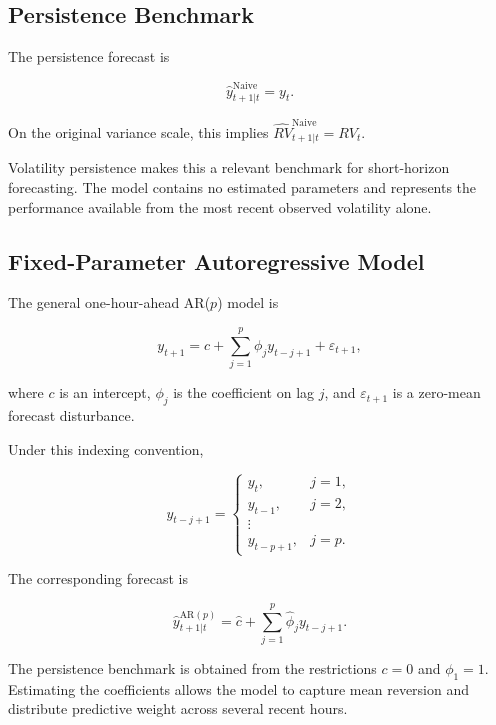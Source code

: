 \subsection{Persistence Benchmark}

The persistence forecast is

\begin{equation}
\widehat{y}_{t+1|t}^{\mathrm{Naive}}
=
y_t.
\label{eq:naive-model}
\end{equation}

On the original variance scale, this implies
\(\widehat{RV}_{t+1|t}^{\mathrm{Naive}}=RV_t\).

Volatility persistence makes this a relevant benchmark for
short-horizon forecasting. The model contains no estimated
parameters and represents the performance available from the
most recent observed volatility alone.

\subsection{Fixed-Parameter Autoregressive Model}

The general one-hour-ahead AR(\(p\)) model is

\begin{equation}
y_{t+1}
=
c
+
\sum_{j=1}^{p}
\phi_j y_{t-j+1}
+
\varepsilon_{t+1},
\label{eq:ar-model}
\end{equation}

where \(c\) is an intercept, \(\phi_j\) is the coefficient on
lag \(j\), and \(\varepsilon_{t+1}\) is a zero-mean forecast
disturbance.

Under this indexing convention,

\[
y_{t-j+1}
=
\begin{cases}
y_t, & j=1,\\
y_{t-1}, & j=2,\\
\vdots\\
y_{t-p+1}, & j=p.
\end{cases}
\]

The corresponding forecast is

\begin{equation}
\widehat{y}_{t+1|t}^{\mathrm{AR}(p)}
=
\widehat{c}
+
\sum_{j=1}^{p}
\widehat{\phi}_j y_{t-j+1}.
\label{eq:ar-forecast}
\end{equation}

The persistence benchmark is obtained from the restrictions
\(c=0\) and \(\phi_1=1\). Estimating the coefficients allows
the model to capture mean reversion and distribute predictive
weight across several recent hours.

